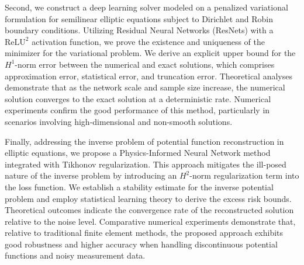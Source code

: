 \begin{enabstract}
Second, we construct a deep learning solver modeled on a penalized variational formulation for semilinear elliptic equations subject to Dirichlet and Robin boundary conditions. Utilizing Residual Neural Networks (ResNets) with a $\mathrm{ReLU}^2$ activation function, we prove the existence and uniqueness of the minimizer for the variational problem. We derive an explicit upper bound for the $H^1$-norm error between the numerical and exact solutions, which comprises approximation error, statistical error, and truncation error. Theoretical analyses demonstrate that as the network scale and sample size increase, the numerical solution converges to the exact solution at a deterministic rate. Numerical experiments confirm the good performance of this method, particularly in scenarios involving high-dimensional and non-smooth solutions.

Finally, addressing the inverse problem of potential function reconstruction in elliptic equations, we propose a Physics-Informed Neural Network method integrated with Tikhonov regularization. This approach mitigates the ill-posed nature of the inverse problem by introducing an $H^2$-norm regularization term into the loss function. We establish a stability estimate for the inverse potential problem and employ statistical learning theory to derive the excess risk bounds. Theoretical outcomes indicate the convergence rate of the reconstructed solution relative to the noise level. Comparative numerical experiments demonstrate that, relative to traditional finite element methods, the proposed approach exhibits good robustness and higher accuracy when handling discontinuous potential functions and noisy measurement data.
\end{enabstract}
\vspace{1em}\par\vfill



